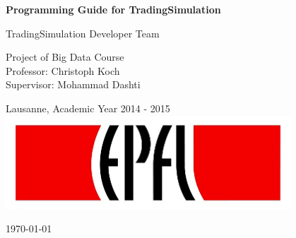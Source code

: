\begin{titlepage}

  \begin{center}

    \vspace*{3\baselineskip}
    {\Large \bfseries Programming Guide for TradingSimulation \\[0.4cm] }

    \noindent
    TradingSimulation Developer Team \\[4cm]

    \begin{framed}
    Project of Big Data Course \\
    Professor: Christoph Koch \\
    Supervisor: Mohammad Dashti
    \end{framed}

    \noindent
    Lausanne, Academic Year 2014 - 2015 \\[1cm]

    \includegraphics[width=0.8\textwidth]{img/epfl}~\\[1cm]

    \vfill

    {\large \today}

  \end{center}

\end{titlepage}

